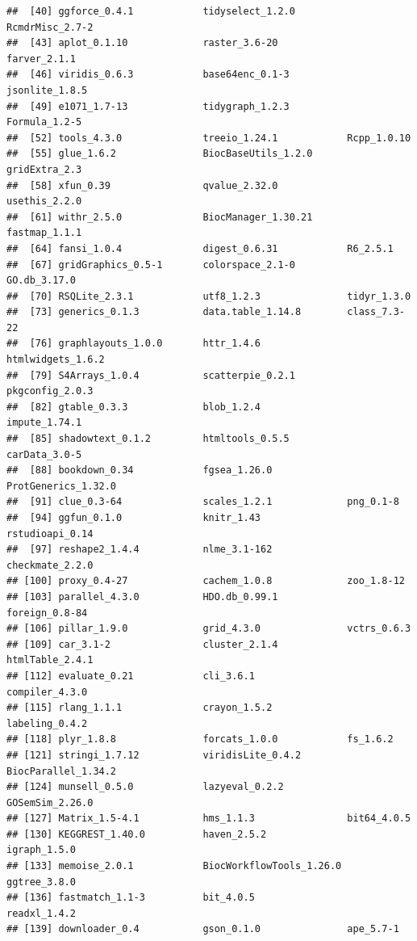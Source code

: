 \documentclass[9pt,a4paper,]{extarticle}
\begin{document}
\begin{verbatim}
##  [40] ggforce_0.4.1            tidyselect_1.2.0         RcmdrMisc_2.7-2         
##  [43] aplot_0.1.10             raster_3.6-20            farver_2.1.1            
##  [46] viridis_0.6.3            base64enc_0.1-3          jsonlite_1.8.5          
##  [49] e1071_1.7-13             tidygraph_1.2.3          Formula_1.2-5           
##  [52] tools_4.3.0              treeio_1.24.1            Rcpp_1.0.10             
##  [55] glue_1.6.2               BiocBaseUtils_1.2.0      gridExtra_2.3           
##  [58] xfun_0.39                qvalue_2.32.0            usethis_2.2.0           
##  [61] withr_2.5.0              BiocManager_1.30.21      fastmap_1.1.1           
##  [64] fansi_1.0.4              digest_0.6.31            R6_2.5.1                
##  [67] gridGraphics_0.5-1       colorspace_2.1-0         GO.db_3.17.0            
##  [70] RSQLite_2.3.1            utf8_1.2.3               tidyr_1.3.0             
##  [73] generics_0.1.3           data.table_1.14.8        class_7.3-22            
##  [76] graphlayouts_1.0.0       httr_1.4.6               htmlwidgets_1.6.2       
##  [79] S4Arrays_1.0.4           scatterpie_0.2.1         pkgconfig_2.0.3         
##  [82] gtable_0.3.3             blob_1.2.4               impute_1.74.1           
##  [85] shadowtext_0.1.2         htmltools_0.5.5          carData_3.0-5           
##  [88] bookdown_0.34            fgsea_1.26.0             ProtGenerics_1.32.0     
##  [91] clue_0.3-64              scales_1.2.1             png_0.1-8               
##  [94] ggfun_0.1.0              knitr_1.43               rstudioapi_0.14         
##  [97] reshape2_1.4.4           nlme_3.1-162             checkmate_2.2.0         
## [100] proxy_0.4-27             cachem_1.0.8             zoo_1.8-12              
## [103] parallel_4.3.0           HDO.db_0.99.1            foreign_0.8-84          
## [106] pillar_1.9.0             grid_4.3.0               vctrs_0.6.3             
## [109] car_3.1-2                cluster_2.1.4            htmlTable_2.4.1         
## [112] evaluate_0.21            cli_3.6.1                compiler_4.3.0          
## [115] rlang_1.1.1              crayon_1.5.2             labeling_0.4.2          
## [118] plyr_1.8.8               forcats_1.0.0            fs_1.6.2                
## [121] stringi_1.7.12           viridisLite_0.4.2        BiocParallel_1.34.2     
## [124] munsell_0.5.0            lazyeval_0.2.2           GOSemSim_2.26.0         
## [127] Matrix_1.5-4.1           hms_1.1.3                bit64_4.0.5             
## [130] KEGGREST_1.40.0          haven_2.5.2              igraph_1.5.0            
## [133] memoise_2.0.1            BiocWorkflowTools_1.26.0 ggtree_3.8.0            
## [136] fastmatch_1.1-3          bit_4.0.5                readxl_1.4.2            
## [139] downloader_0.4           gson_0.1.0               ape_5.7-1
\end{verbatim}
\end{document}
